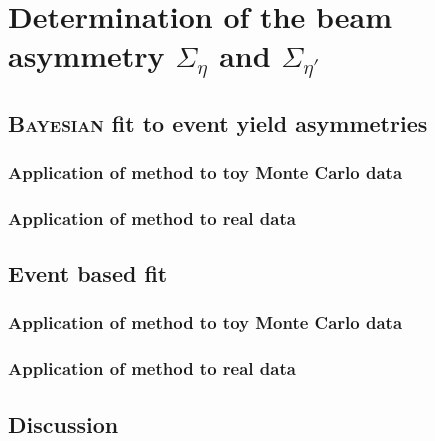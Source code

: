 \chapter{Determination of the beam asymmetry $\Sigma_{\eta}$ and $\Sigma_{\eta'}$}

\section{\textsc{Bayesian} fit to event yield asymmetries}
\subsection{Application of method to toy Monte Carlo data}
\subsection{Application of method to real data}

\section{Event based fit}
\subsection{Application of method to toy Monte Carlo data}

\subsection{Application of method to real data}

\section{Discussion}